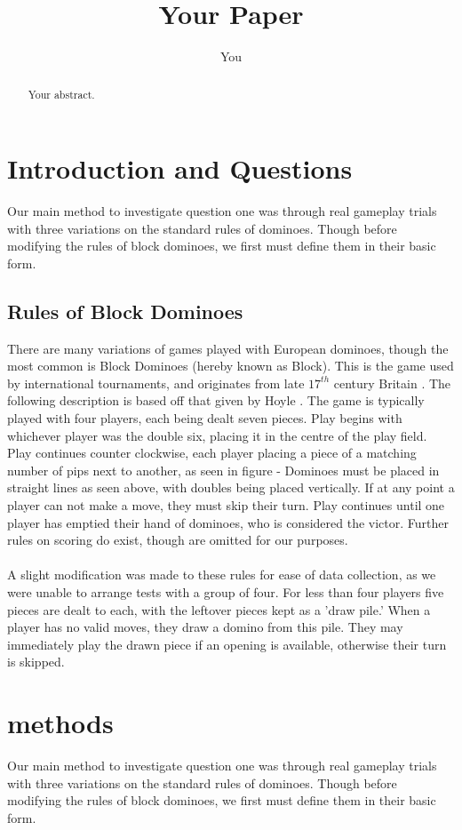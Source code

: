 \documentclass{article}
\title{Your Paper}
\author{You}
\begin{document}
\maketitle

\begin{abstract}
Your abstract.
\end{abstract}

\section{Introduction and Questions}
Our main method to investigate question one was through real gameplay trials with three variations on the standard rules of dominoes. Though before modifying the rules of block dominoes, we first must define them in their basic form.

\subsection{Rules of Block Dominoes}
There are many variations of games played with European dominoes, though the most common is Block Dominoes (hereby known as Block). This is the game used by international tournaments, and originates from late \(17^{th}\) century Britain \cite{Rules}. The following description is based off that given by Hoyle \cite{Rules}. The game is typically played with four players, each being dealt seven pieces. Play begins with whichever player was the double six, placing it in the centre of the play field. Play continues counter clockwise, each player placing a piece of a matching number of pips next to another, as seen in figure - %
Dominoes must be placed in straight lines as seen above, with doubles being placed vertically. If at any point a player can not make a move, they must skip their turn. Play continues until one player has emptied their hand of dominoes, who is considered the victor. Further rules on scoring do exist, though are omitted for our purposes. \\\\A slight modification was made to these rules for ease of data collection, as we were unable to arrange tests with a group of four. For less than four players five pieces are dealt to each, with the leftover pieces kept as a 'draw pile.' When a player has no valid moves, they draw a domino from this pile. They may immediately play the drawn piece if an opening is available, otherwise their turn is skipped.

\section{methods}
Our main method to investigate question one was through real gameplay trials with three variations on the standard rules of dominoes. Though before modifying the rules of block dominoes, we first must define them in their basic form. %
\end{document}
